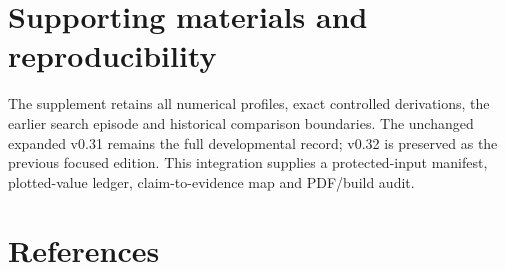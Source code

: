 \documentclass[11pt,letterpaper]{article}
\begin{document}
\section*{Supporting materials and reproducibility}

The supplement retains all numerical profiles, exact controlled derivations, the earlier search episode and historical comparison boundaries. The unchanged expanded v0.31 remains the full developmental record; v0.32 is preserved as the previous focused edition. This integration supplies a protected-input manifest, plotted-value ledger, claim-to-evidence map and PDF/\allowbreak{}build audit.


\clearpage

\section*{References}

\begingroup
\end{document}

